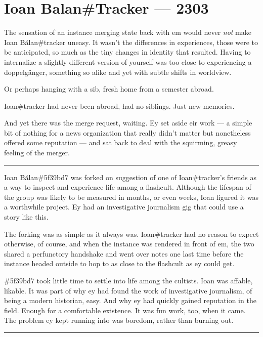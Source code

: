 \chapter*{Ioan Balan\#Tracker — 2303}

The sensation of an instance merging state back with em would never \emph{not} make Ioan Bălan\#tracker uneasy. It wasn't the differences in experiences, those were to be anticipated, so much as the tiny changes in identity that resulted. Having to internalize a slightly different version of yourself was too close to experiencing a doppelgänger, something so alike and yet with subtle shifts in worldview.

Or perhaps hanging with a sib, fresh home from a semester abroad.

Ioan\#tracker had never been abroad, had no siblings. Just new memories.

And yet there was the merge request, waiting. Ey set aside eir work --- a simple bit of nothing for a news organization that really didn't matter but nonetheless offered some reputation --- and sat back to deal with the squirming, greasy feeling of the merger.

\begin{center}\rule{0.5\linewidth}{\linethickness}\end{center}

Ioan Bălan\#5f39bd7 was forked on suggestion of one of Ioan\#tracker's friends as a way to inspect and experience life among a flashcult. Although the lifespan of the group was likely to be measured in months, or even weeks, Ioan figured it was a worthwhile project. Ey had an investigative journalism gig that could use a story like this.

The forking was as simple as it always was. Ioan\#tracker had no reason to expect otherwise, of course, and when the instance was rendered in front of em, the two shared a perfunctory handshake and went over notes one last time before the instance headed outside to hop to as close to the flashcult as ey could get.

\#5f39bd7 took little time to settle into life among the cultists. Ioan was affable, likable. It was part of why ey had found the work of investigative journalism, of being a modern historian, easy. And why ey had quickly gained reputation in the field. Enough for a comfortable existence. It was fun work, too, when it came. The problem ey kept running into was boredom, rather than burning out.

\begin{center}\rule{0.5\linewidth}{\linethickness}\end{center}

